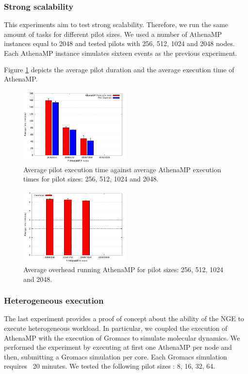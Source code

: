 \subsubsection{Strong scalability}
This experiments aim to test strong scalability. Therefore, we run the same amount of tasks for different pilot sizes. 
We used a number of AthenaMP instances equal to 2048 and tested pilots with 256, 512, 1024 and 2048 nodes. 
Each AthenaMP instance simulates sixteen events as the previous experiment.

Figure \ref{fig:strongScala} depicts the average pilot duration and  the average execution time of AthenaMP.  

\begin{figure}[!htb]
        \includegraphics[width=0.5\textwidth]{./figures/NGE/strongET.pdf}
    \caption{Average pilot execution time against average AthenaMP execution times  for pilot sizes: 256, 512, 1024 and 2048.}
\label{fig:strongScala}
\end{figure}
\begin{figure}[!htb]
        \includegraphics[width=0.5\textwidth]{./figures/NGE/strongOver.pdf}
    \caption{Average overhead running AthenaMP for pilot sizes: 256, 512, 1024 and 2048.}
\label{fig:strongScalb}
\end{figure}

 
\subsubsection{Heterogeneous execution}

The last experiment provides a proof of concept about the ability of the NGE to execute heterogeneous workload.
In particular, we coupled the execution of AthenaMP with the execution of Gromacs to simulate molecular dynamics. 
We performed the experiment by executing at first one AthenaMP per node and then, submitting a Gromacs simulation per core. Each Gromacs simulation requires ~20 minutes.
We tested the following pilot sizes : 8, 16, 32, 64. 

